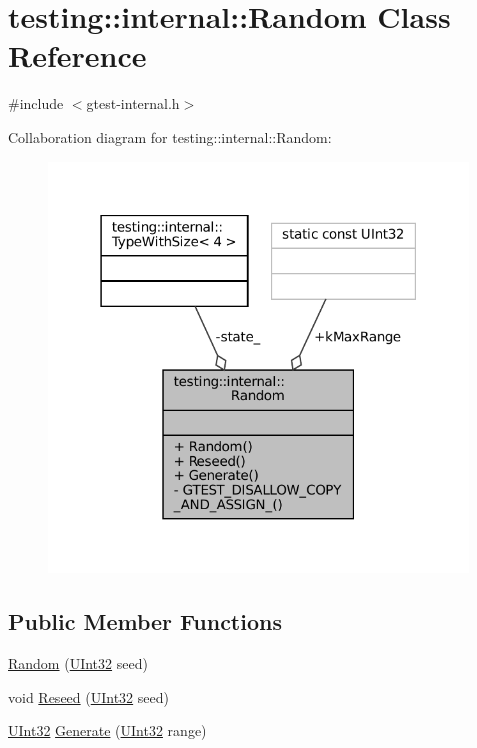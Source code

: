 \hypertarget{classtesting_1_1internal_1_1Random}{}\section{testing\+:\+:internal\+:\+:Random Class Reference}
\label{classtesting_1_1internal_1_1Random}


{\ttfamily \#include $<$gtest-\/internal.\+h$>$}



Collaboration diagram for testing\+:\+:internal\+:\+:Random\+:
\nopagebreak
\begin{figure}[H]
\begin{center}
\leavevmode
\includegraphics[width=316pt]{classtesting_1_1internal_1_1Random__coll__graph}
\end{center}
\end{figure}
\subsection*{Public Member Functions}
\begin{DoxyCompactItemize}
\item 
\hyperlink{classtesting_1_1internal_1_1Random_a6e112be5e7cce00551f6383025f69460}{Random} (\hyperlink{namespacetesting_1_1internal_a40d4fffcd2bf56f18b1c380615aa85e3}{U\+Int32} seed)
\item 
void \hyperlink{classtesting_1_1internal_1_1Random_adf2f24199318a46f885c78f50d89a69e}{Reseed} (\hyperlink{namespacetesting_1_1internal_a40d4fffcd2bf56f18b1c380615aa85e3}{U\+Int32} seed)
\item 
\hyperlink{namespacetesting_1_1internal_a40d4fffcd2bf56f18b1c380615aa85e3}{U\+Int32} \hyperlink{classtesting_1_1internal_1_1Random_a9315b7fb621cbcfdf92ed4b5e584c0db}{Generate} (\hyperlink{namespacetesting_1_1internal_a40d4fffcd2bf56f18b1c380615aa85e3}{U\+Int32} range)
\end{DoxyCompactItemize}
